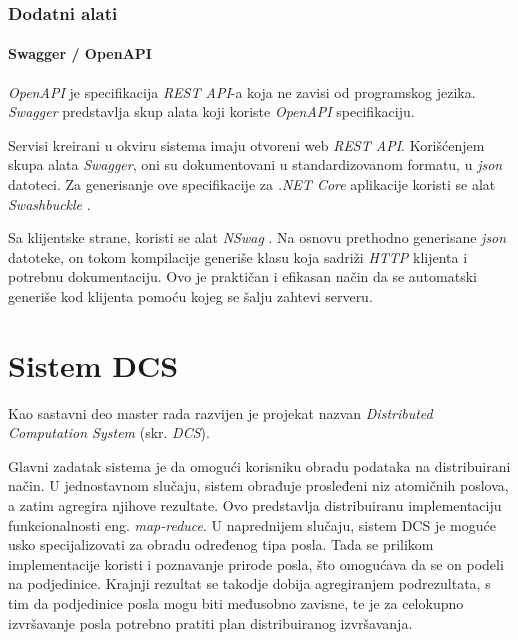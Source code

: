 \documentclass[12pt,oneside]{memoir}
\begin{document}
\subsection{Dodatni alati}

\subsubsection{Swagger / OpenAPI}

\emph{OpenAPI} \cite{OpenAPI} je specifikacija \emph{REST API}-a koja ne zavisi od programskog jezika. \emph{Swagger} \cite{Swagger} predstavlja skup alata koji koriste \emph{OpenAPI} specifikaciju.

Servisi kreirani u okviru sistema imaju otvoreni web \emph{REST API}. Korišćenjem skupa alata \emph{Swagger}, oni su dokumentovani u standardizovanom formatu, u \emph{json} datoteci. Za generisanje ove specifikacije za \emph{.NET Core} aplikacije koristi se alat \emph{Swashbuckle} \cite{Swashbuckle}.

Sa klijentske strane, koristi se alat \emph{NSwag} \cite{NSwag}. Na osnovu prethodno generisane \emph{json} datoteke, on tokom kompilacije generiše klasu koja sadriži \emph{HTTP} klijenta i potrebnu dokumentaciju. Ovo je praktičan i efikasan način da se automatski generiše kod klijenta pomoću kojeg se šalju zahtevi serveru.



\chapter{Sistem DCS}
\label{chp:sistemdcs}

Kao sastavni deo master rada razvijen je projekat nazvan \emph{Distributed Computation System} (skr. \emph{DCS}).

Glavni zadatak sistema je da omogući korisniku obradu podataka na distribuirani način.
U jednostavnom slučaju, sistem obrađuje prosleđeni niz atomičnih poslova, a zatim agregira njihove rezultate. Ovo predstavlja distribuiranu implementaciju funkcionalnosti eng. \emph{map-reduce}.
U naprednijem slučaju, sistem DCS je moguće usko specijalizovati za obradu određenog tipa posla. Tada se prilikom implementacije koristi i poznavanje prirode posla, što omogućava da se on podeli na podjedinice. Krajnji rezultat se takodje dobija agregiranjem podrezultata, s tim da podjedinice posla mogu biti međusobno zavisne, te je za celokupno izvršavanje posla potrebno pratiti plan distribuiranog izvršavanja.
\end{document}
